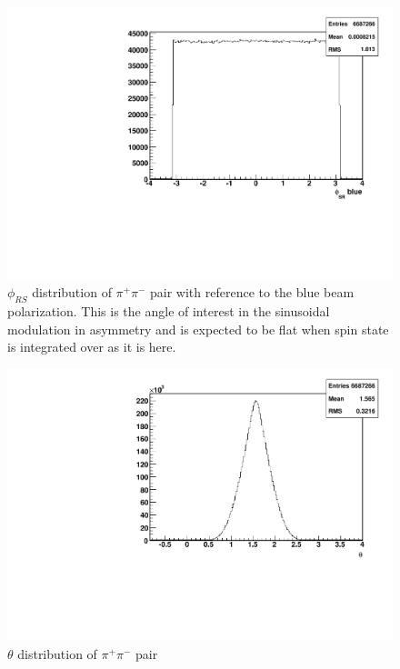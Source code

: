 \documentclass[abstract = on,listof=totoc, bibliography=totoc]{scrreprt}
\newcommand{\phirs}{\phi_{RS}}
\newcommand{\pip}{\pi^+}
\newcommand{\pim}{\pi^-}
\newcommand{\pair}{$\pip\pim$ }
\begin{document}
\begin{figure}
\begin{center}
\includegraphics[width = .8\textwidth]{hPhiSRb}
\caption[$\phirs$ distribution of \pair pair with reference to the blue beam polarization]{$\phirs$ distribution of \pair pair with reference to the blue beam polarization. This is the angle of interest in the sinusoidal modulation in asymmetry and is expected to be flat when spin state is integrated over as it is here.}
\label{fig:phisrb}
\end{center}
\end{figure}


\begin{figure}
\begin{center}
\includegraphics[width = .8\textwidth]{hTheta}
\caption[$\theta$ distribution of \pair pair]{$\theta$ distribution of \pair pair}
\label{fig:theta}
\end{center}
\end{figure}

\clearpage %
\end{document}
